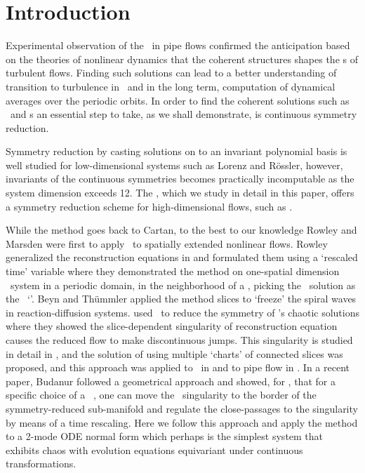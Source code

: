 \section{Introduction}
\label{s:intro}

Experimental observation of the \reqva\ in pipe flows confirmed
the anticipation based on the theories of nonlinear dynamics that the
coherent structures shapes the \statesp s of turbulent
flows. Finding such solutions can lead to a better
understanding of transition to turbulence in \NS\ and in the long term,
computation of dynamical averages over the periodic orbits. In order to
find the coherent solutions such as \reqva\ and \rpo s an essential step
to take, as we shall demonstrate, is continuous symmetry reduction.

Symmetry reduction by casting solutions on to an invariant polynomial basis
is well studied for low-dimensional systems such as Lorenz
and R\"{o}ssler, however, invariants of the continuous symmetries becomes
practically incomputable as the system dimension exceeds 12.
The \mslices%
,
which we study in detail in this paper, offers a symmetry reduction
scheme for high-dimensional flows, such as \NS.

While the method goes back to Cartan, to the
best to our knowledge Rowley and Marsden
were first to apply \mslices\ to spatially extended nonlinear flows. Rowley
\etal~ generalized the reconstruction equations
in and formulated them using a `rescaled
time' variable where they demonstrated the method on one-spatial dimension \KS\ system
in a periodic domain, in the neighborhood of a \reqv, picking
the \reqv\ solution as the \slice\ `\template'.  Beyn and
Th\"{u}mmler applied the method slices to `freeze' the spiral
waves in reaction-diffusion systems.
 used \mslices\ to reduce the  symmetry of
\cLf's chaotic solutions where they showed the slice-dependent
singularity of reconstruction equation causes the reduced flow to make
discontinuous jumps. This singularity is studied in detail in
, and the solution of using multiple `charts' of connected
slices was proposed, and this approach was applied to \cLf\
in  and to pipe flow in . In a
recent paper, Budanur \etal{} followed a geometrical approach
and showed, for \SOn{2}, that for a specific choice of a \slice\
\template , one can move the \slice\ singularity to the border of the
symmetry-reduced sub-manifold and regulate the close-passages to the
singularity by means of a time rescaling. Here we follow this approach
and apply the method to a 2-mode  ODE normal form which perhaps is
the simplest system that exhibits chaos with evolution equations
equivariant under continuous \SOn{2} transformations.

